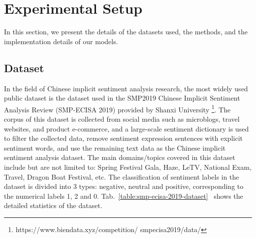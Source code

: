 \section{Experimental Setup}

In this section, we present the details of the datasets used, the methods, and the implementation details of our models.

\subsection{Dataset}

In the field of Chinese implicit sentiment analysis research, the most widely used public dataset is the dataset used in the SMP2019 Chinese Implicit Sentiment Analysis Review (SMP-ECISA 2019) provided by Shanxi University \footnote{https://www.biendata.xyz/competition/ smpecisa2019/data/}.
The corpus of this dataset is collected from social media such as microblogs, travel websites, and product e-commerce, and a large-scale sentiment dictionary is used to filter the collected data, remove sentiment expression sentences with explicit sentiment words, and use the remaining text data as the Chinese implicit sentiment analysis dataset.
The main domains/topics covered in this dataset include but are not limited to: Spring Festival Gala, Haze, LeTV, National Exam, Travel, Dragon Boat Festival, etc. The classification of sentiment labels in the dataset is divided into 3 types: negative, neutral and positive, corresponding to the numerical labels 1, 2 and 0. Tab.~\ref{table:smp-ecisa-2019-dataset}~ shows the detailed statistics of the dataset.

\begin{table}
    \caption{SMP-ECISA 2019 Dataset}
    \label{table:smp-ecisa-2019-dataset}
    \centering
\end{table}


